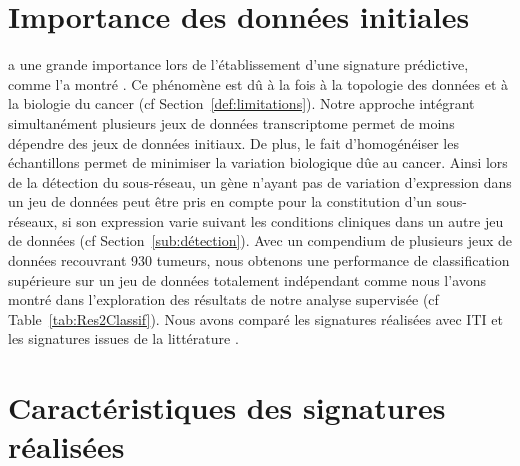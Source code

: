 	\section{\textcolor{blue!45!black}{Importance des données initiales}}
		 a une grande importance lors de l'établissement d'une signature prédictive, comme l'a montré \citeauthor{Michiels2005}.
		Ce phénomène est dû à la fois à la topologie des données et à la biologie du cancer (cf Section~\ref{def:limitations}).
		Notre approche intégrant simultanément plusieurs jeux de données transcriptome permet de moins dépendre des jeux de données initiaux.
		De plus, le fait d'homogénéiser les échantillons permet de minimiser la variation biologique dûe au cancer.
		Ainsi lors de la détection du sous-réseau, un gène n'ayant pas de variation d'expression dans un jeu de données peut être pris en compte pour la constitution d'un sous-réseaux, si son expression varie suivant les conditions cliniques dans un autre jeu de données (cf Section~\ref{sub:détection}).
		Avec un compendium de plusieurs jeux de données recouvrant 930 tumeurs, nous obtenons une performance de classification supérieure sur un jeu de données totalement indépendant comme nous l'avons montré dans l'exploration des résultats de notre analyse supervisée (cf Table~\ref{tab:Res2Classif}).
		Nous avons comparé les signatures réalisées avec ITI et les signatures issues de la littérature \citep{vandevijver2002,Wang2005,Sotiriou2006}.

	\section{\textcolor{blue!45!black}{Caractéristiques des signatures réalisées}}

